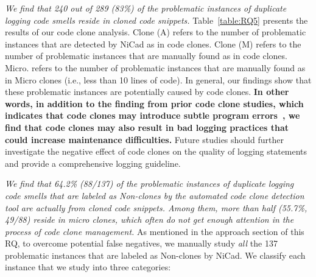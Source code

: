 \begin{table*}
    \vspace{-0.6cm}

    \label{table:RQ5}
\end{table*}





{\em We find that 240 out of 289 (83\%) of the problematic instances of duplicate logging code smells reside in cloned code snippets.}
Table~\ref{table:RQ5} presents the results of our  code clone analysis. {\sf Clone (A)} refers to the number of problematic instances that are detected by NiCad as in code clones. {\sf Clone (M)} refers to the number of problematic instances that are manually found as in code clones. {\sf Micro.} refers to the number of problematic instances that are manually found as in Micro clones (i.e., less than 10 lines of code). In general, our findings show that these problematic instances are potentially caused by code clones. {\bf In other words, in addition to the finding from prior code clone studies, which indicates that code clones may introduce subtle program errors~\cite{contextCloneBugs, tracyhallcodesmell}, we find that code clones may also result in bad logging practices that could increase maintenance difficulties.} Future studies should further investigate the negative effect of code clones on the quality of logging statements and provide a comprehensive logging guideline.%



{\em We find that 64.2\% (88/137) of the problematic instances of duplicate logging code smells that are labeled as Non-clones by the automated code clone detection tool are actually from cloned code snippets. Among them, more than half (55.7\%, 49/88) reside in micro clones, which often do not get enough attention in the process of code clone management.}
As mentioned in the approach section of this RQ, to overcome potential false negatives, we manually study {\em all} the 137 problematic instances that are labeled as Non-clones by NiCad. %
We classify each instance that we study into three categories: 

